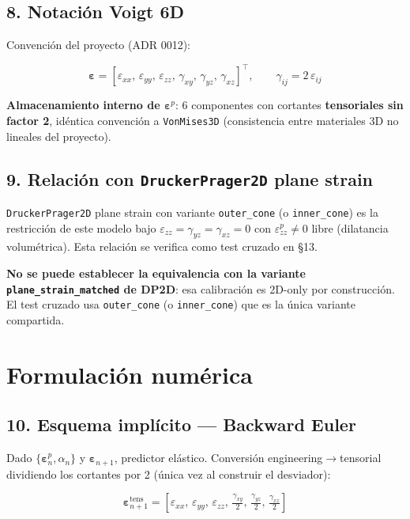 \documentclass[11pt,letterpaper,oneside]{report}
\begin{document}
\subsection{8. Notación Voigt 6D}

Convención del proyecto (ADR 0012):

\[
\boldsymbol\varepsilon = [\varepsilon_{xx},\,\varepsilon_{yy},\,\varepsilon_{zz},\,\gamma_{xy},\,\gamma_{yz},\,\gamma_{xz}]^\top, \qquad \gamma_{ij} = 2\,\varepsilon_{ij}
\]

\textbf{Almacenamiento interno de $\boldsymbol\varepsilon^p$}: 6 componentes con cortantes \textbf{tensoriales sin factor 2}, idéntica convención a \texttt{VonMises3D} (consistencia entre materiales 3D no lineales del proyecto).

\subsection{9. Relación con \texttt{DruckerPrager2D} plane strain}

\texttt{DruckerPrager2D} plane strain con variante \texttt{outer\_cone} (o \texttt{inner\_cone}) es la restricción de este modelo bajo $\varepsilon_{zz} = \gamma_{yz} = \gamma_{xz} = 0$ con $\varepsilon^p_{zz} \neq 0$ libre (dilatancia volumétrica). Esta relación se verifica como test cruzado en §13.

\textbf{No se puede establecer la equivalencia con la variante \texttt{plane\_strain\_matched} de DP2D}: esa calibración es 2D-only por construcción. El test cruzado usa \texttt{outer\_cone} (o \texttt{inner\_cone}) que es la única variante compartida.


\section{Formulación numérica}

\subsection{10. Esquema implícito --- Backward Euler}

Dado $\{\boldsymbol\varepsilon^p_n, \alpha_n\}$ y $\boldsymbol\varepsilon_{n+1}$, predictor elástico. Conversión engineering\ensuremath{\to}tensorial dividiendo los cortantes por 2 (única vez al construir el desviador):

\[
\boldsymbol\varepsilon^\text{tens}_{n+1} = [\varepsilon_{xx},\,\varepsilon_{yy},\,\varepsilon_{zz},\,\tfrac{\gamma_{xy}}{2},\,\tfrac{\gamma_{yz}}{2},\,\tfrac{\gamma_{xz}}{2}]
\]
\end{document}
